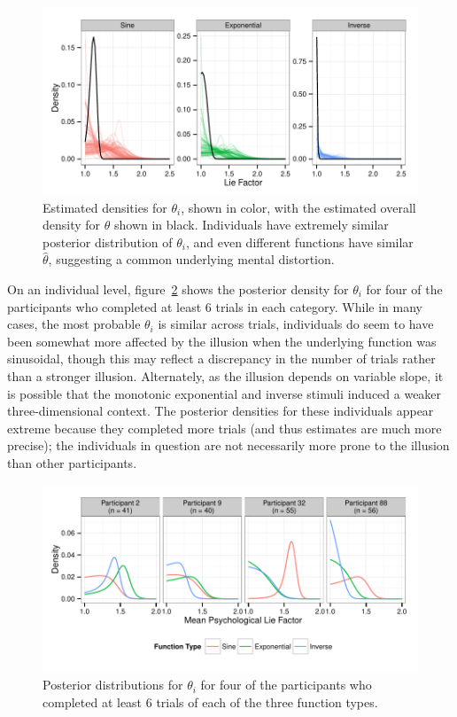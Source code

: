 \documentclass[11pt]{isuthesis}\usepackage[]{graphicx}\usepackage[]{color}
\begin{document}
\begin{figure}\centering
\includegraphics[width=6in, trim=0in .1in 0in .1in]{fig-spaghettiIndivDists}
\caption{Estimated densities for $\theta_i$, shown in color, with the estimated overall density for $\theta$ shown in black. Individuals have extremely similar posterior distribution of $\theta_i$, and even different functions have similar $\hat\theta$, suggesting a common underlying mental distortion.}\label{fig:overalldensity}
\end{figure}

On an individual level, figure~\ref{fig:indivdensity} shows the posterior density for $\theta_i$ for four of the participants who completed at least 6 trials in each category. While in many cases, the most probable $\theta_i$ is similar across trials, individuals do seem to have been somewhat more affected by the illusion when the underlying function was sinusoidal, though this may reflect a discrepancy in the number of trials rather than a stronger illusion. Alternately, as the illusion depends on variable slope, it is possible that the monotonic exponential and inverse stimuli induced a weaker three-dimensional context. The posterior densities for these individuals appear extreme because they completed more trials (and thus estimates are much more precise); the individuals in question are not necessarily more prone to the illusion than other participants. 

\begin{figure}\centering
\includegraphics[width=6in, trim=0in .2in 0in .1in]{fig-IndivMeanAllFcns}
\caption{Posterior distributions for $\theta_i$ for four of the participants who completed at least 6 trials of each of the three function types.}\label{fig:indivdensity}
\end{figure}
\end{document}
